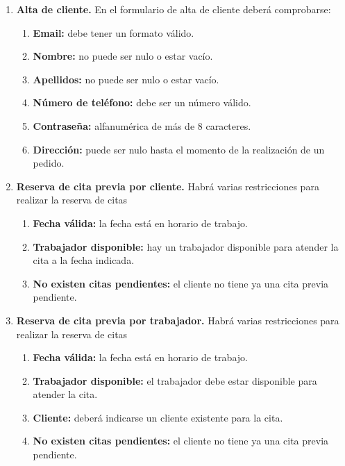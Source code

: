 \begin{enumerate}[leftmargin=1.75cm,start=1,label={\bfseries RS-\arabic*.}]
    \item \textbf{Alta de cliente.} En el formulario de alta de cliente deberá comprobarse:
    \begin{enumerate}[start=1,label={\bfseries RS-3.\arabic*.}]
        \item \textbf{Email:} debe tener un formato válido.
        \item \textbf{Nombre:} no puede ser nulo o estar vacío.
        \item \textbf{Apellidos:} no puede ser nulo o estar vacío.
        \item \textbf{Número de teléfono:} debe ser un número válido.
        \item \textbf{Contraseña:} alfanumérica de más de 8 caracteres.
        \item \textbf{Dirección:} puede ser nulo hasta el momento de la realización de un pedido.
    \end{enumerate}

    \item \textbf{Reserva de cita previa por cliente.} Habrá varias restricciones para realizar la reserva de citas
    \begin{enumerate}[start=1,label={\bfseries RS-4.\arabic*.}]
        \item \textbf{Fecha válida:} la fecha está en horario de trabajo.
        \item \textbf{Trabajador disponible:} hay un trabajador disponible para atender la cita a la fecha indicada.
        \item \textbf{No existen citas pendientes:} el cliente no tiene ya una cita previa pendiente.
    \end{enumerate}

    \item \textbf{Reserva de cita previa por trabajador.} Habrá varias restricciones para realizar la reserva de citas
    \begin{enumerate}[start=1,label={\bfseries RS-5.\arabic*.}]
        \item \textbf{Fecha válida:} la fecha está en horario de trabajo.
        \item \textbf{Trabajador disponible:} el trabajador debe estar disponible para atender la cita.
        \item \textbf{Cliente:} deberá indicarse un cliente existente para la cita.
        \item \textbf{No existen citas pendientes:} el cliente no tiene ya una cita previa pendiente.
    \end{enumerate}
    

\end{enumerate}
